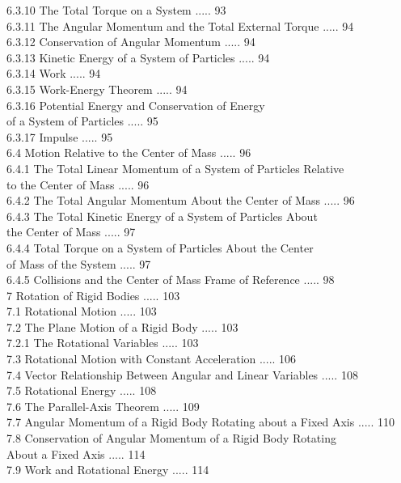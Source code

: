 \documentclass[10pt]{article}
\begin{document}
6.3.10 The Total Torque on a System ..... 93\\
6.3.11 The Angular Momentum and the Total External Torque ..... 94\\
6.3.12 Conservation of Angular Momentum ..... 94\\
6.3.13 Kinetic Energy of a System of Particles ..... 94\\
6.3.14 Work ..... 94\\
6.3.15 Work-Energy Theorem ..... 94\\
6.3.16 Potential Energy and Conservation of Energy\\
of a System of Particles ..... 95\\
6.3.17 Impulse ..... 95\\
6.4 Motion Relative to the Center of Mass ..... 96\\
6.4.1 The Total Linear Momentum of a System of Particles Relative\\
to the Center of Mass ..... 96\\
6.4.2 The Total Angular Momentum About the Center of Mass ..... 96\\
6.4.3 The Total Kinetic Energy of a System of Particles About\\
the Center of Mass ..... 97\\
6.4.4 Total Torque on a System of Particles About the Center\\
of Mass of the System ..... 97\\
6.4.5 Collisions and the Center of Mass Frame of Reference ..... 98\\
7 Rotation of Rigid Bodies ..... 103\\
7.1 Rotational Motion ..... 103\\
7.2 The Plane Motion of a Rigid Body ..... 103\\
7.2.1 The Rotational Variables ..... 103\\
7.3 Rotational Motion with Constant Acceleration ..... 106\\
7.4 Vector Relationship Between Angular and Linear Variables ..... 108\\
7.5 Rotational Energy ..... 108\\
7.6 The Parallel-Axis Theorem ..... 109\\
7.7 Angular Momentum of a Rigid Body Rotating about a Fixed Axis ..... 110\\
7.8 Conservation of Angular Momentum of a Rigid Body Rotating\\
About a Fixed Axis ..... 114\\
7.9 Work and Rotational Energy ..... 114\\
\end{document}
